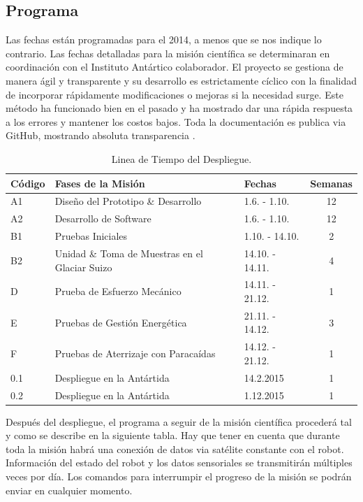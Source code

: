 \documentclass[a4paper,12pt]{article}
\begin{document}
\subsection{Programa}

Las fechas están programadas para el 2014, a menos que se nos indique lo contrario. Las fechas detalladas para la misión científica se determinaran en coordinación con el Instituto Antártico colaborador. El proyecto se gestiona de manera ágil y transparente y su desarrollo es estrictamente cíclico con la finalidad de incorporar rápidamente modificaciones o mejoras si la necesidad surge. Este método ha funcionado bien en el pasado y ha mostrado dar una rápida respuesta a los errores y mantener los costos bajos.
Toda la documentación es publica via GitHub, mostrando absoluta transparencia \cite{octanisgithub}. 

\begin{table}[h!]
\centering
\begin{tabular}{ l | l | l | c }

\bfseries{Código} & \bfseries{Fases de la Misión} & \bfseries{Fechas} & \bfseries{Semanas} \\
\hline
A1 & Diseño del Prototipo \& Desarrollo & 1.6. - 1.10. & 12 \\
A2 & Desarrollo de Software & 1.6. - 1.10. & 12 \\
B1 & Pruebas Iniciales & 1.10. - 14.10. & 2  \\
B2 & Unidad \& Toma de Muestras en el Glaciar Suizo & 14.10. - 14.11. & 4 \\
D & Prueba de Esfuerzo Mecánico  & 14.11. - 21.12. & 1 \\
E & Pruebas de Gestión Energética & 21.11. - 14.12. & 3 \\
F & Pruebas de Aterrizaje con Paracaídas & 14.12. - 21.12. & 1 \\
0.1 & Despliegue en la Antártida  & 14.2.2015 &  1 \\
0.2 & Despliegue en la Antártida  & 1.12.2015 &  1 \\

\end{tabular}
\caption{Linea de Tiempo del Despliegue.}
\end{table}

Después del despliegue, el programa a seguir de la misión científica procederá tal y como se describe en la siguiente tabla. Hay que tener en cuenta que durante toda la misión habrá una conexión de datos via satélite constante con el robot. Información del estado del robot y los datos sensoriales se transmitirán múltiples veces por día. Los comandos para interrumpir el progreso de la misión se podrán enviar en cualquier momento.
\end{document}
